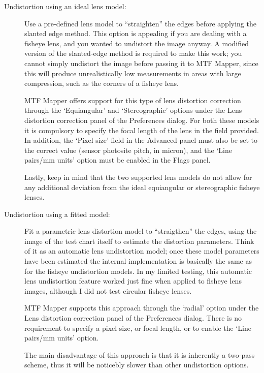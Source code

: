 \documentclass[a4paper]{article}
\begin{document}
\begin{description}
\item[Undistortion using an ideal lens model:]

Use a pre-defined lens model to ``straighten'' the edges before applying the
slanted edge method. This option is appealing if you are dealing with a
fisheye lens, and you wanted to undistort the image anyway. A modified
version of the slanted-edge method is required to make this work; you cannot
simply undistort the image before passing it to MTF Mapper, since this will
produce unrealistically low measurements in areas with large compression,
such as the corners of a fisheye lens.

MTF Mapper offers support for this type of lens distortion correction
through the `Equiangular' and `Stereographic' options under the Lens
distortion correction panel of the \textsf{Preferences} dialog. For both
these models it is compulsory to specify the focal length of the lens in the
field provided. In addition, the `Pixel size' field in the Advanced panel
must also be set to the correct value (sensor photosite pitch, in micron),
and the `Line pairs/mm units' option must be enabled in the Flags panel.

Lastly, keep in mind that the two supported lens models do not allow for any
additional deviation from the ideal equiangular or stereographic fisheye
lenses.

\item[Undistortion using a fitted model:]

Fit a parametric lens distortion model to ``straigthen'' the edges, using
the image of the test chart itself to estimate the distortion parameters.
Think of it as an automatic lens undistortion model; once these model
parameters have been estimated the internal implementation is basically the
same as for the fisheye undistortion models. In my limited testing, this
automatic lens undistortion feature worked just fine when applied to fisheye
lens images, although I did not test circular fisheye lenses.

MTF Mapper supports this approach through the `radial' option under the Lens
distortion correction panel of the \textsf{Preferences} dialog. There is no
requirement to specify a pixel size, or focal length, or to enable the `Line
pairs/mm units' option.

The main disadvantage of this approach is that it is inherently a two-pass
scheme, thus it will be noticebly slower than other undistortion options.


\end{description}
\end{document}
